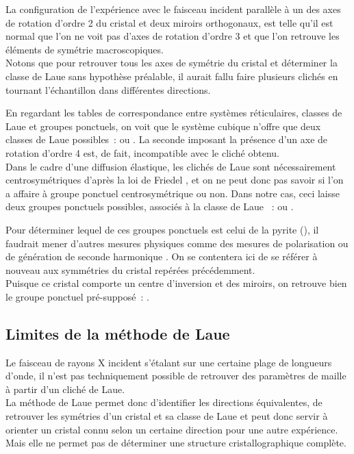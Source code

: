 La configuration de l'expérience avec le faisceau incident parallèle à un des axes de rotation d'ordre 2 du cristal et deux miroirs orthogonaux, est telle qu'il est normal que l'on ne voit pas d'axes de rotation d'ordre 3 et que l'on retrouve les éléments de symétrie macroscopiques\cite{JJRousseau2007}.\\
Notons que pour retrouver tous les axes de symétrie du cristal et déterminer la classe de Laue sans hypothèse préalable, il aurait fallu faire plusieurs clichés en tournant l'échantillon dans différentes directions.

En regardant les tables de correspondance entre systèmes réticulaires, classes de Laue et groupes ponctuels\cite{JJRousseau2007,ShmueliIUCr2016}, on voit que le système cubique n'offre que deux classes de Laue possibles~:  ou .
La seconde imposant la présence d'un axe de rotation d'ordre 4 est, de fait, incompatible avec le cliché obtenu.\\
Dans le cadre d'une diffusion élastique, les clichés de Laue sont nécessairement centrosymétriques d'après la loi de Friedel \cite{JJRousseau2007}, et on ne peut donc pas savoir si l'on a affaire à groupe ponctuel centrosymétrique ou non. Dans notre cas, ceci laisse deux groupes ponctuels possibles, associés à la classe de Laue ~:  ou .

Pour déterminer lequel de ces groupes ponctuels est celui de la pyrite (), il faudrait mener d'autres mesures physiques comme des mesures de polarisation ou de génération de seconde harmonique \cite{ShmueliIUCr2016}. On se contentera ici de se référer à nouveau aux symmétries du cristal repérées précédemment.\\
Puisque ce cristal comporte un centre d'inversion et des miroirs, on retrouve bien le groupe ponctuel pré-supposé~: .

\subsection{Limites de la méthode de Laue}

Le faisceau de rayons X incident s'étalant sur une certaine plage de longueurs d'onde, il n'est pas techniquement possible de retrouver des paramètres de maille à partir d'un cliché de Laue.\\
La méthode de Laue permet donc d'identifier les directions équivalentes, de retrouver les symétries d'un cristal et sa classe de Laue et peut donc servir à orienter un cristal connu selon un certaine direction pour une autre expérience.
Mais elle ne permet pas de déterminer une structure cristallographique complète.

